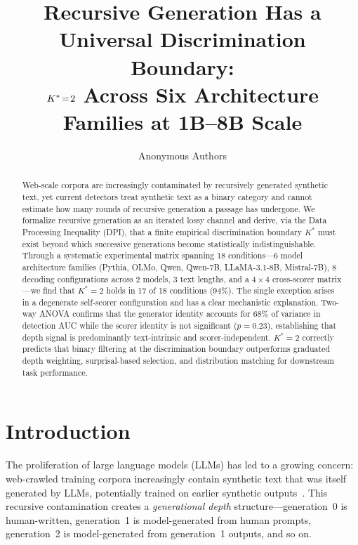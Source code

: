 \documentclass[11pt]{article}
\title{Recursive Generation Has a Universal Discrimination Boundary:\\
  $\Kstar\!=\!2$ Across Six Architecture Families at 1B--8B Scale}
\author{
  Anonymous Authors
}
\date{}
\newcommand{\Kstar}{K^{*}}
\begin{document}
\maketitle

\begin{abstract}
Web-scale corpora are increasingly contaminated by recursively generated synthetic text, yet current detectors treat synthetic text as a binary category and cannot estimate how many rounds of recursive generation a passage has undergone.
We formalize recursive generation as an iterated lossy channel and derive, via the Data Processing Inequality (DPI), that a finite empirical discrimination boundary $\Kstar$ must exist beyond which successive generations become statistically indistinguishable.
Through a systematic experimental matrix spanning 18 conditions---6 model architecture families (Pythia, OLMo, Qwen, Qwen-7B, LLaMA-3.1-8B, Mistral-7B), 8 decoding configurations across 2 models, 3 text lengths, and a $4\!\times\!4$ cross-scorer matrix---we find that $\Kstar\!=\!2$ holds in 17 of 18 conditions (94\%).
The single exception arises in a degenerate self-scorer configuration and has a clear mechanistic explanation.
Two-way ANOVA confirms that the generator identity accounts for 68\% of variance in detection AUC while the scorer identity is not significant ($p\!=\!0.23$), establishing that depth signal is predominantly text-intrinsic and scorer-independent.
$\Kstar\!=\!2$ correctly predicts that binary filtering at the discrimination boundary outperforms graduated depth weighting, surprisal-based selection, and distribution matching for downstream task performance.
\end{abstract}

\section{Introduction}
\label{sec:intro}

The proliferation of large language models (LLMs) has led to a growing concern: web-crawled training corpora increasingly contain synthetic text that was itself generated by LLMs, potentially trained on earlier synthetic outputs~\citep{shumailov2024model,alemohammad2024selfconsuming}.
This recursive contamination creates a \emph{generational depth} structure---generation~0 is human-written, generation~1 is model-generated from human prompts, generation~2 is model-generated from generation~1 outputs, and so on.
\end{document}
